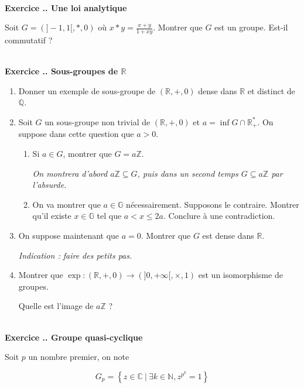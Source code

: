 \documentclass{article}
\newcommand{\mb}[1]{\mathbb{#1}}
\newcounter{exo}
\newcommand{\exercice}[1][\null]{\textbf{\\ Exercice \thesection.\theexo. #1} \addtocounter{exo}{1}}
\begin{document}
\exercice[Une loi analytique]

Soit $G = (]-1,1[, *, 0)$ où $x*y = \frac{x+y}{1+xy}$. Montrer que $G$ est un groupe. Est-il commutatif ?

\exercice[Sous-groupes de $\mb{R}$]

\begin{enumerate}

\item Donner un exemple de sous-groupe de $(\mb{R}, +, 0)$ dense dans $\mb{R}$ et distinct de $\mb{Q}$.

\item Soit $G$ un sous-groupe non trivial de $(\mb{R}, +, 0)$ et $a = \inf G \cap \mb{R}^*_+$. On suppose dans cette question que $a > 0$.

\begin{enumerate}

\item Si $a \in G$, montrer que $G = a \mb{Z}$.

\emph{On montrera d'abord $a\mb{Z} \subseteq G$, puis dans un second temps $G \subseteq a \mb{Z}$ par l'absurde.}

\item On va montrer que $a \in \mb{G}$ nécessairement. Supposons le contraire. Montrer qu'il existe $x \in \mb{G}$ tel que $a< x \le 2a$. Conclure à une contradiction.

\end{enumerate}

\item On suppose maintenant que $a = 0$. Montrer que $G$ est dense dans $\mb{R}$.

\emph{Indication : faire des petits pas.}

\item Montrer que $ \exp : (\mb{R}, +, 0) \rightarrow (]0, + \infty[, \times, 1)$ est un isomorphisme de groupes.

Quelle est l'image de $a \mb{Z}$ ?

\end{enumerate}

\exercice[Groupe quasi-cyclique]

Soit $p$ un nombre premier, on note 

\begin{equation*}
    G_p = \left\{ z \in \mb{C} ~|~ \exists k \in \mb{N}, z^{p^k} = 1 \right\}
\end{equation*}
\end{document}
